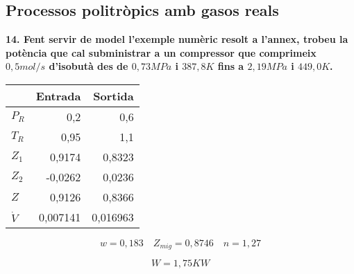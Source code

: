 \documentclass[a4paper]{article}
\begin{document}
\subsection*{Processos politròpics amb gasos reals}

\textbf{14. Fent servir de model l’exemple numèric resolt a l’annex, trobeu la potència que cal subministrar a un compressor que comprimeix $0,5 mol/s$ d’isobutà des de $0,73 MPa$ i $387,8 K$ fins a $2,19 MPa$ i $449,0 K$.}

\begin{center}
	\begin{tabular}{l|rr}
		& Entrada & Sortida \\
		\hline
		$P_R$ & 0,2 & 0,6 \\
		$T_R$ & 0,95 & 1,1 \\
		$Z_1$ & 0,9174 & 0,8323 \\
		$Z_2$ & -0,0262 & 0,0236 \\
		$Z$ & 0,9126 & 0,8366 \\
		$\dot{V}$ & 0,007141 & 0,016963 \\
	\end{tabular}
\end{center}

$$ w = 0,183 \quad Z_{mig} = 0,8746 \quad n = 1,27 $$

$$ \boxed{W = 1,75KW} $$
\end{document}
